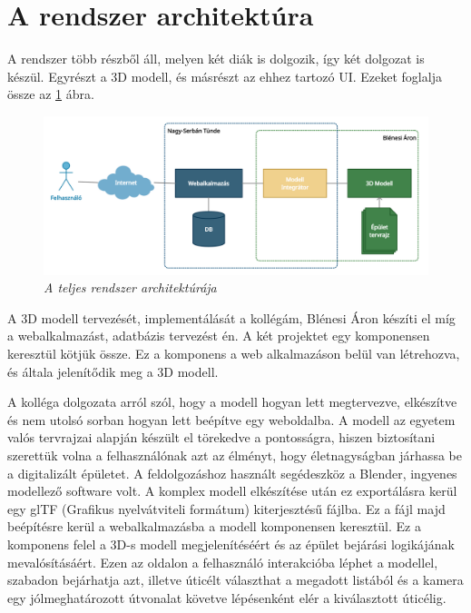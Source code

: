 
\section{A rendszer architektúra}
\label{sec:rendterv}

A rendszer több részből áll, melyen két diák is dolgozik, így két dolgozat is készül. Egyrészt a 3D modell, és másrészt az ehhez tartozó UI. Ezeket foglalja össze az \ref{fig:systemArchBig} ábra.
\begin{figure}[H]
	\centering
	\includegraphics[width=1\linewidth]{figures/images/kozosfazis.png}
	\caption[A teljes rendszer architektúrája]{\textit{A teljes rendszer architektúrája}}
	\label{fig:systemArchBig}
\end{figure}

A 3D modell tervezését, implementálását a kollégám, Blénesi Áron készíti el míg a webalkalmazást, adatbázis tervezést én. A két projektet egy komponensen keresztül kötjük össze. Ez a komponens a web alkalmazáson belül van létrehozva, és általa jelenítődik meg a 3D modell.

A kolléga dolgozata arról szól, hogy a modell hogyan lett megtervezve, elkészítve és nem utolsó sorban hogyan lett beépítve egy weboldalba. A modell az egyetem valós tervrajzai alapján készült el törekedve a pontosságra, hiszen biztosítani szerettük volna a felhasználónak azt az élményt, hogy életnagyságban járhassa be a digitalizált épületet. A feldolgozáshoz használt segédeszköz a Blender, ingyenes modellező software volt. A komplex modell elkészítése után ez exportálásra kerül egy glTF (Grafikus nyelvátviteli formátum) kiterjesztésű fájlba. Ez a fájl majd beépítésre kerül a webalkalmazásba a modell komponensen keresztül. Ez a komponens felel a 3D-s modell megjelenítéséért és az épület bejárási logikájának mevalósításáért. Ezen az oldalon a felhasználó interakcióba léphet a modellel, szabadon bejárhatja azt, illetve úticélt választhat a megadott listából és a kamera egy jólmeghatározott útvonalat követve lépésenként elér a kiválasztott úticélig.
